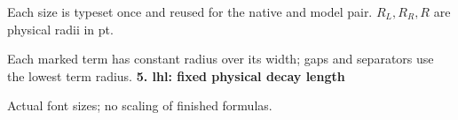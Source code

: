 \documentclass{article}
\newcommand\High{\frac{\displaystyle\sum_{k=1}^n x_k}{1+\frac pq}}
\newcommand\Medium{\frac{x^2+y^2}{z}}
\newcommand\Mark[1]{\directlua{grid.mark(#1)}}
\begin{document}
\par\medskip
Each size is typeset once and reused for the native and model pair. $R_L,R_R,R$ are physical radii in pt.\par
Each marked term has constant radius over its width; gaps and separators use the lowest term radius.
\newpage
{\Large\bfseries 5. lhl: fixed physical decay length}\par\medskip
{} Actual font sizes; no scaling of finished formulas.\par\medskip
\end{document}
